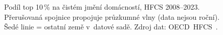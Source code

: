 \def\strEuBohatstviVyvojTitle{Podíl top 10\,\% domácností na čistém jmění}%
\def\strEuBohatstviVyvojXlabel{rok (\acs{HFCS} vlna)}%
\def\strEuBohatstviVyvojYlabel{podíl top 10\,\% domácností na čistém jmění [\%]}%
\def\strEuBohatstviVyvojCaption{Podíl top 10\,\% na čistém jmění domácností, HFCS 2008--2023. Přerušovaná spojnice propojuje průzkumné vlny (data nejsou roční). Šedé linie = ostatní země v~datové sadě. Zdroj dat: \acs{OECD}~\acs{HFCS}~\cite{oecd_hfcs_wealth_top10_PC}.}%
%
\begin{figure}[H]
  \centering
  
  \caption{\strEuBohatstviVyvojCaption}
  \label{fig:eu_bohatstvi_vyvoj}
\end{figure}
